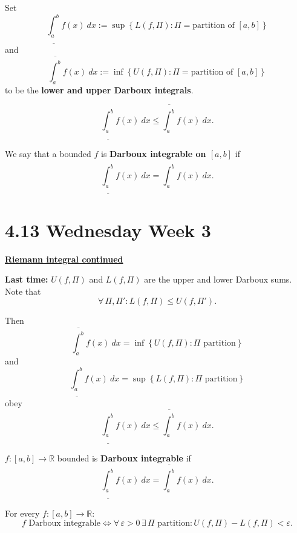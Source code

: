 \documentclass{notes}
\begin{document}
\begin{defn}
  Set 
  \[
    \underline{\int_a^b} f(x)\ dx := \sup \left \{ L(f, \Pi) : \Pi = \text{partition of $[a, b]$} \right \}
  \]
  and 
  \[
    \overline{\int_a^b} f(x)\ dx := \inf \left \{ U(f, \Pi) : \Pi = \text{partition of $[a, b]$} \right \}
  \]
  to be the {\boldmath \bfseries lower and upper Darboux integrals}.
\end{defn}

\begin{note}
  \[
    \underline{\int_a^b} f(x)\ dx \leq \overline{\int_a^b} f(x)\ dx.
  \]
\end{note}

\begin{defn}
  We say that a bounded $f$ is {\boldmath \bfseries Darboux integrable on $[a, b]$} if 
  \[
    \underline{\int_a^b} f(x)\ dx = \overline{\int_a^b} f(x)\ dx.
  \]
\end{defn}

\newpage

\section{4.13 Wednesday Week 3}

{\boldmath \bfseries \underline{Riemann integral continued}}

{\boldmath \bfseries Last time:} $U(f, \Pi)$ and $L(f, \Pi)$ are the upper and lower Darboux sums.
Note that 
\[
  \forall \, \Pi, \Pi': L(f, \Pi) \leq U(f, \Pi').
\]

Then 
\[
  \overline{\int_a^b} f(x)\ dx = \inf \left \{ U(f, \Pi) : \text{$\Pi$ partition} \right \}
\]
and 
\[
  \underline{\int_a^b} f(x)\ dx = \sup \left \{ L(f, \Pi) : \text{$\Pi$ partition} \right \}
\]
obey
\[
  \underline{\int_a^b} f(x)\ dx \leq \overline{\int_a^b} f(x)\ dx.
\]

\begin{defn}
  $f \colon [a, b] \to \mathbb R$ bounded is {\boldmath \bfseries Darboux integrable} if 
  \[
    \underline{\int_a^b} f(x)\ dx = \overline{\int_a^b} f(x)\ dx.
  \]
\end{defn}

\begin{lem}
  For every $f \colon [a, b] \to \mathbb R$: 
  \[
    \text{$f$ Darboux integrable} \Leftrightarrow \forall \, \varepsilon > 0 \, \exists \, \Pi \text{ partition}: U(f, \Pi) - L(f, \Pi) < \varepsilon.
  \]
\end{lem}
\end{document}
